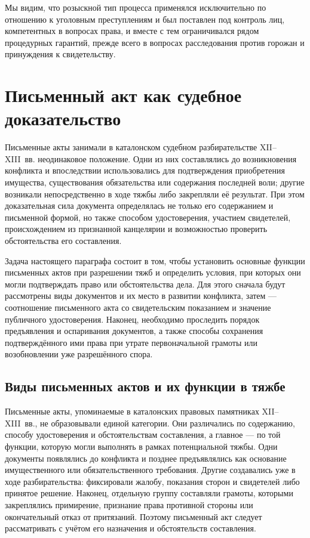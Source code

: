 Мы видим, что розыскной тип процесса применялся исключительно по отношению к уголовным преступлениям и был поставлен под контроль лиц, компетентных в вопросах права, и вместе с тем ограничивался рядом процедурных гарантий, прежде всего в вопросах расследования против горожан и принуждения к свидетельству.

\section{Письменный акт как судебное доказательство}

Письменные акты занимали в каталонском судебном разбирательстве XII--XIII~вв. неодинаковое положение. Одни из них составлялись до возникновения конфликта и впоследствии использовались для подтверждения приобретения имущества, существования обязательства или содержания последней воли; другие возникали непосредственно в ходе тяжбы либо закрепляли её результат. При этом доказательная сила документа определялась не только его содержанием и письменной формой, но также способом удостоверения, участием свидетелей, происхождением из признанной канцелярии и возможностью проверить обстоятельства его составления.

Задача настоящего параграфа состоит в том, чтобы установить основные функции письменных актов при разрешении тяжб и определить условия, при которых они могли подтверждать право или обстоятельства дела. Для этого сначала будут рассмотрены виды документов и их место в развитии конфликта, затем --- соотношение письменного акта со свидетельским показанием и значение публичного удостоверения. Наконец, необходимо проследить порядок предъявления и оспаривания документов, а также способы сохранения подтверждённого ими права при утрате первоначальной грамоты или возобновлении уже разрешённого спора.

\subsection{Виды письменных актов и их функции в тяжбе}

Письменные акты, упоминаемые в каталонских правовых памятниках XII--XIII~вв., не образовывали единой категории. Они различались по содержанию, способу удостоверения и обстоятельствам составления, а главное --- по той функции, которую могли выполнять в рамках потенциальной тяжбы. Одни документы появлялись до конфликта и позднее предъявлялись как основание имущественного или обязательственного требования. Другие создавались уже в ходе разбирательства: фиксировали жалобу, показания сторон и свидетелей либо принятое решение. Наконец, отдельную группу составляли грамоты, которыми закреплялись примирение, признание права противной стороны или окончательный отказ от притязаний. Поэтому письменный акт следует рассматривать с учётом его назначения и обстоятельств составления.

